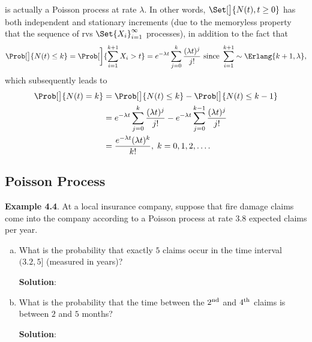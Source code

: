 \begin{Regular}
\begin{enumerate}[(1)]
              is actually a Poisson process at rate $ \lambda $. In other words, $ \Set[\big]{N(t),t\ge 0} $ has both
              independent and stationary increments (due to the memoryless property that the sequence of rvs $ \Set{X_i}_{i=1}^\infty $ processes),
              in addition to the fact that
              \[ \Prob[\big]{N(t)\le k}=\Prob[\bigg]{\sum_{i=1}^{k+1}X_i>t}=e^{-\lambda t}\sum_{j=0}^{k}\frac{(\lambda t)^j}{j!}\text{ since }\sum_{i=1}^{k+1}\sim \Erlang{k+1,\lambda}, \]
              which subsequently leads to
              \begin{align*}
                  \Prob[\big]{N(t)=k}
                   & =\Prob[\big]{N(t)\le k}-\Prob[\big]{N(t)\le k-1}                                                             \\
                   & =e^{-\lambda t}\sum_{j=0}^{k}\frac{(\lambda t)^j}{j!}-e^{-\lambda t}\sum_{j=0}^{k-1}\frac{(\lambda t)^j}{j!} \\
                   & =\frac{e^{-\lambda t}(\lambda t)^k}{k!},\; k=0,1,2,\ldots.
              \end{align*}
    \end{enumerate}
\end{Regular}
\subsection*{Poisson Process}
\begin{Example}
    \textbf{Example 4.4}. At a local insurance company, suppose that fire damage claims come into the
    company according to a Poisson process at rate $3.8$ expected claims per year.
    \begin{enumerate}[(a)]
        \item What is the probability that exactly $5$ claims occur in the time interval $(3.2, 5]$ (measured
              in years)?

              \textbf{Solution}:
        \item What is the probability that the time between the $2\textsuperscript{nd}$ and $4\textsuperscript{th}$ claims is between $2$ and $5$
              months?

              \textbf{Solution}:
    \end{enumerate}
\end{Example}
